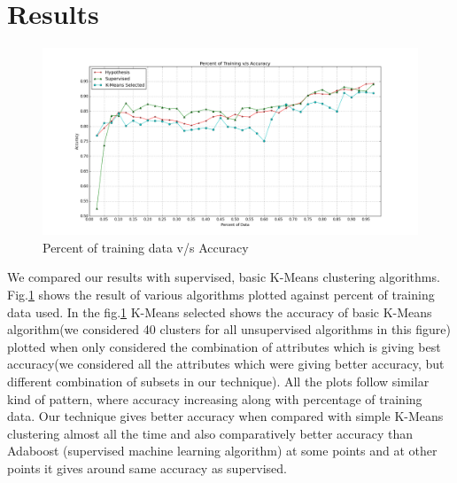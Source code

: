 \documentclass[conference]{IEEEtran}
\begin{document}
\section{Results}
\begin{figure}[!t]
	\centering
\includegraphics[width=7.16in]{super_hypo_accuracy_percent_training}
	\caption{Percent of training data v/s Accuracy}
	\label{fig_hypo_accu_percent}
\end{figure}
We compared our results with supervised, basic K-Means clustering algorithms. Fig.\ref{fig_hypo_accu_percent} shows the result of various algorithms plotted against percent of training data used. In the fig.\ref{fig_hypo_accu_percent} K-Means selected shows the accuracy of basic K-Means algorithm(we considered 40 clusters for all unsupervised algorithms in this figure) plotted when only considered the combination of attributes which is giving best accuracy(we considered all the attributes which were giving better accuracy, but different combination of subsets in our technique). All the plots follow similar kind of pattern, where accuracy increasing along with percentage of training data. Our technique gives better accuracy when compared with simple K-Means clustering almost all the time and also comparatively better accuracy than Adaboost (supervised machine learning algorithm) at some points and at other points it gives around same accuracy as supervised.
%
%
\end{document}
